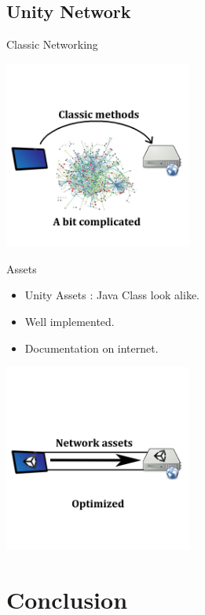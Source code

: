 \documentclass[a4paper,10pt]{beamer}
\begin{document}
		\subsection{Unity Network}
			
			\begin{frame}{Classic Networking}
					\centerline{\includegraphics[height=175pt]{images/network/classicnet.png}}
			\end{frame}
			
			\begin{frame}{Assets}
				\begin{itemize}
					\item Unity Assets : Java Class look alike.
					\item Well implemented.
					\item Documentation on internet.
				\end{itemize}	
				
				\centerline{\includegraphics[height=175pt]{images/network/optimized.png}}
				
				
			\end{frame}
			
		

	
	\section{Conclusion}
	
\end{document}
